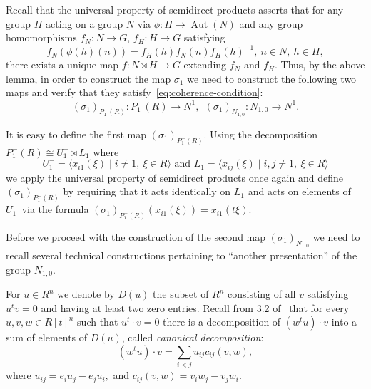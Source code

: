 \documentclass[oneside, 10pt]{amsart}
\DeclareMathOperator{\Aut}{Aut}
\numberwithin{equation}{section}
\numberwithin{lemma}{section}
\theoremstyle{definition}
\theoremstyle{remark}
\begin{document}
Recall that the universal property of semidirect products asserts that for any group $H$ acting on a group $N$ via $\phi \colon H \to \Aut(N)$ and any group homomorphisms
 $f_N\colon N \to G$, $f_H\colon H \to G$ satisfying 
\begin{equation} \label{eq:coherence-condition} f_N(\phi(h)(n)) = f_H(h) f_N(n) f_H(h)^{-1},\ n\in N,\ h\in H,\end{equation} there exists a unique map $f\colon N \rtimes H \to G$
 extending $f_N$ and $f_H$. 
Thus, by the above lemma, in order to construct the map $\sigma_1$ we need to construct the following two maps and verify that they satisfy~\eqref{eq:coherence-condition}:
\[ (\sigma_1)_{P_1^-(R)} \colon P_1^-(R) \to N^1, \ \ (\sigma_1)_{N_{1,0}} \colon N_{1,0} \to N^1.\]

It is easy to define the first map $(\sigma_1)_{P_1^-(R)}$.
Using the decomposition $P_1^-(R) \cong U^-_1 \rtimes L_1$ where 
\[U^-_1 = \langle x_{i1}(\xi) \mid i\neq 1,\ \xi\in R \rangle \text{ and } L_1 = \langle x_{ij}(\xi) \mid i,  j \neq 1,\ \xi\in R\rangle \]
we apply the universal property of semidirect products once again 
 and define $(\sigma_1)_{P_1^-(R)}$ by requiring that it acts identically on $L_1$ 
and acts on elements of $U^-_1$ via the formula $(\sigma_1)_{P_1^-(R)}(x_{i1}(\xi))= x_{i1}(t\xi)$.

Before we proceed with the construction of the second map $(\sigma_1)_{N_{1,0}}$ we need to recall several technical
 constructions pertaining to ``another presentation'' of the group $N_{1,0}$.

For $u \in R^n$ we denote by $D(u)$ the subset of $R^n$ consisting of all $v$ satisfying $u^tv = 0$ and having at least two zero entries.
Recall from 3.2 of~\cite{Ka77} that for every $u, v, w \in R[t]^n$ such that $u^t \cdot v = 0$ there
 is a decomposition of $(w^t u) \cdot v$ into a sum of elements of $D(u)$, called {\it canonical decomposition}:
\setcounter{equation}{1}
\renewcommand{\theequation}{\arabic{equation}}
\begin{equation} \label{eq:canonical} (w^tu) \cdot v=\sum_{i<j}u_{ij} c_{ij}(v, w),\end{equation}
where $u_{ij}=e_iu_j-e_ju_i,$ and $c_{ij}(v, w)=v_iw_j-v_jw_i.$
\end{document}
